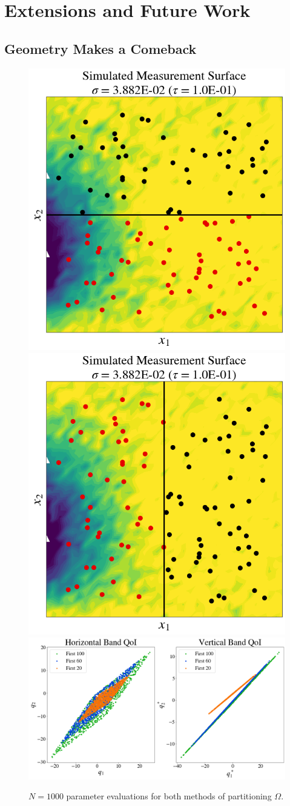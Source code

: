 \section{Extensions and Future Work}


\subsection{Geometry Makes a Comeback}

\begin{frame}[t]

\begin{figure}
\centering
\includegraphics[width=0.25\linewidth]{figures/pde-highd/pde-highd_sensors_D2.png}
\includegraphics[width=0.25\linewidth]{figures/pde-highd/pde-highd_sensors-alt_D2.png}
\includegraphics[width=0.5\linewidth]{figures/pde-highd/pde-highd_geom_D2.png}
\caption{
$N=1000$ parameter evaluations for both methods of partitioning $\Omega$.
}
\label{fig:pde-highd-2d-geometry}
\end{figure}

\end{frame}


